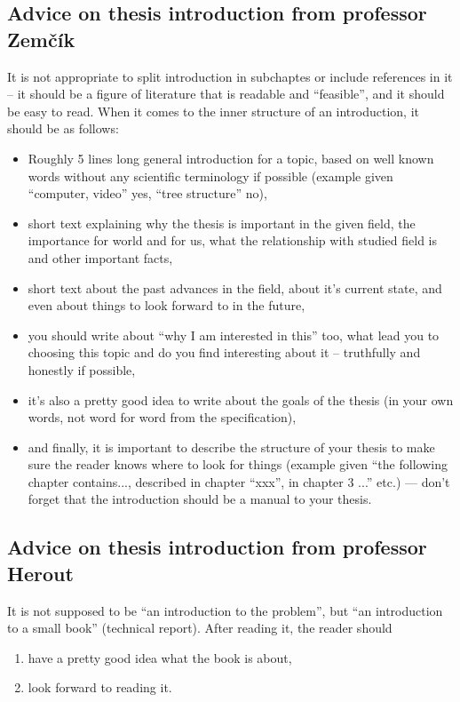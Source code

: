 \subsection*{Advice on thesis introduction from professor Zemčík}
It is not appropriate to split introduction in subchaptes or include references in it -- it should be a figure of literature that is readable and ``feasible'', and it should be easy to read. When it comes to the inner structure of an introduction, it should be as follows:
\begin{itemize}
  \item{Roughly 5 lines long general introduction for a topic, based on well known words without any scientific terminology if possible (example given ``computer, video'' yes, ``tree structure'' no),}
  \item{short text explaining why the thesis is important in the given field, the importance for world and for us, what the relationship with studied field is and other important facts,}
  \item{short text about the past advances in the field, about it's current state, and even about things to look forward to in the future,}
  \item{you should write about ``why I am interested in this'' too, what lead you to choosing this topic and do you find interesting about it -- truthfully and honestly if possible,}
  \item{it's also a pretty good idea to write about the goals of the thesis (in your own words, not word for word from the specification),}
  \item{and finally, it is important to describe the structure of your thesis to make sure the reader knows where to look for things (example given ``the following chapter contains..., described in chapter ``xxx'', in chapter 3 ...'' etc.) --- don't forget that the introduction should be a manual to your thesis.}
\end{itemize}

\begin{samepage}
\subsection*{Advice on thesis introduction from professor Herout}
It is not supposed to be ``an introduction to the problem'', but ``an introduction to a small book'' (technical report). After reading it, the reader should
\begin{enumerate}
  \item{have a pretty good idea what the book is about,}
  \item{look forward to reading it.}
\end{enumerate}
\end{samepage}

